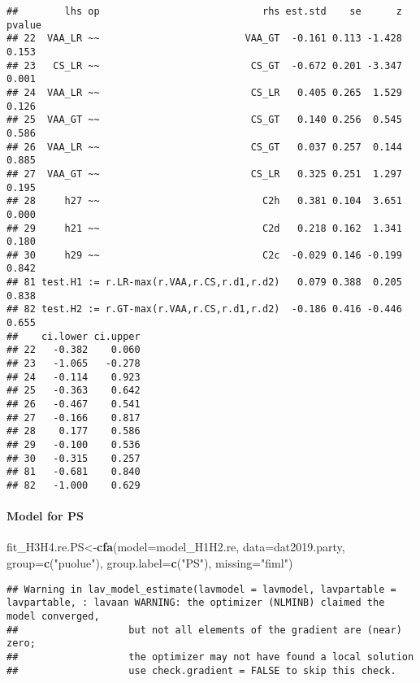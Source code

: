 \documentclass[
]{article}
\newenvironment{Shaded}{\begin{snugshade}}{\end{snugshade}}
\newcommand{\DataTypeTok}[1]{\textcolor[rgb]{0.13,0.29,0.53}{#1}}
\newcommand{\KeywordTok}[1]{\textcolor[rgb]{0.13,0.29,0.53}{\textbf{#1}}}
\newcommand{\NormalTok}[1]{#1}
\newcommand{\StringTok}[1]{\textcolor[rgb]{0.31,0.60,0.02}{#1}}
\begin{document}
\begin{verbatim}
##        lhs op                            rhs est.std    se      z pvalue
## 22  VAA_LR ~~                         VAA_GT  -0.161 0.113 -1.428  0.153
## 23   CS_LR ~~                          CS_GT  -0.672 0.201 -3.347  0.001
## 24  VAA_LR ~~                          CS_LR   0.405 0.265  1.529  0.126
## 25  VAA_GT ~~                          CS_GT   0.140 0.256  0.545  0.586
## 26  VAA_LR ~~                          CS_GT   0.037 0.257  0.144  0.885
## 27  VAA_GT ~~                          CS_LR   0.325 0.251  1.297  0.195
## 28     h27 ~~                            C2h   0.381 0.104  3.651  0.000
## 29     h21 ~~                            C2d   0.218 0.162  1.341  0.180
## 30     h29 ~~                            C2c  -0.029 0.146 -0.199  0.842
## 81 test.H1 := r.LR-max(r.VAA,r.CS,r.d1,r.d2)   0.079 0.388  0.205  0.838
## 82 test.H2 := r.GT-max(r.VAA,r.CS,r.d1,r.d2)  -0.186 0.416 -0.446  0.655
##    ci.lower ci.upper
## 22   -0.382    0.060
## 23   -1.065   -0.278
## 24   -0.114    0.923
## 25   -0.363    0.642
## 26   -0.467    0.541
## 27   -0.166    0.817
## 28    0.177    0.586
## 29   -0.100    0.536
## 30   -0.315    0.257
## 81   -0.681    0.840
## 82   -1.000    0.629
\end{verbatim}

\newpage

\hypertarget{model-for-ps}{%
\paragraph{Model for PS}\label{model-for-ps}}

\begin{Shaded}
\begin{Highlighting}[]
\NormalTok{fit_H3H4.re.PS<-}\KeywordTok{cfa}\NormalTok{(}\DataTypeTok{model=}\NormalTok{model_H1H2.re,}
                    \DataTypeTok{data=}\NormalTok{dat2019.party,}
                    \DataTypeTok{group=}\KeywordTok{c}\NormalTok{(}\StringTok{"puolue"}\NormalTok{),}
                    \DataTypeTok{group.label=}\KeywordTok{c}\NormalTok{(}\StringTok{"PS"}\NormalTok{),}
                    \DataTypeTok{missing=}\StringTok{"fiml"}\NormalTok{)}
\end{Highlighting}
\end{Shaded}

\begin{verbatim}
## Warning in lav_model_estimate(lavmodel = lavmodel, lavpartable = lavpartable, : lavaan WARNING: the optimizer (NLMINB) claimed the model converged,
##                   but not all elements of the gradient are (near) zero;
##                   the optimizer may not have found a local solution
##                   use check.gradient = FALSE to skip this check.
\end{verbatim}
\end{document}
